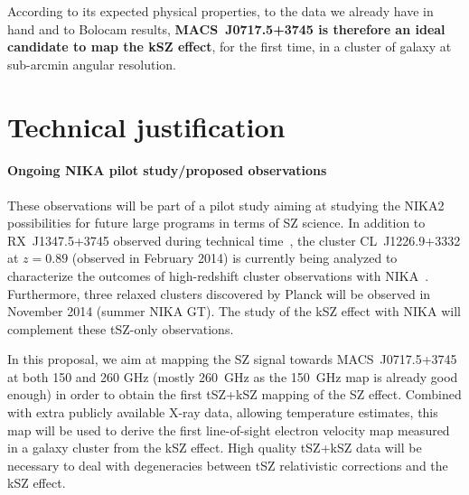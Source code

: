 \documentclass[11pt,a4paper,twoside,graphicx,color]{article}
\begin{document}
According to its expected physical properties, to the data we already have in hand and to Bolocam results, {\bf \mbox{MACS~J0717.5+3745} is therefore an ideal candidate to map the kSZ effect}, for the first time, in a cluster of galaxy at sub-arcmin angular resolution.

\section{Technical justification}
\paragraph{\large Ongoing NIKA pilot study/proposed observations}
These observations will be part of a pilot study aiming at studying the NIKA2 possibilities for future large programs in terms of SZ science. In addition to \mbox{RX~J1347.5+3745} observed during technical time~\citep{adam2013}, the cluster \mbox{CL~J1226.9+3332} at $z=0.89$ (observed in February 2014) is currently being analyzed to characterize the outcomes of high-redshift cluster observations with NIKA~\citep{CL2014}. Furthermore, three relaxed clusters discovered by Planck will be observed in November 2014 (summer NIKA GT). The study of the kSZ effect with NIKA will complement these tSZ-only observations.

In this proposal, we aim at mapping the SZ signal towards \mbox{MACS~J0717.5+3745} at both 150 and 260 GHz (mostly 260~GHz as the 150~GHz map is already good enough) in order to obtain the first tSZ+kSZ mapping of the SZ effect. Combined with extra publicly available \mbox{X-ray} data, allowing temperature estimates, this map will be used to derive the first line-of-sight electron velocity map measured in a galaxy cluster from the kSZ effect. High quality tSZ+kSZ data will be necessary to deal with degeneracies between tSZ relativistic corrections and the kSZ effect.

\end{document}

